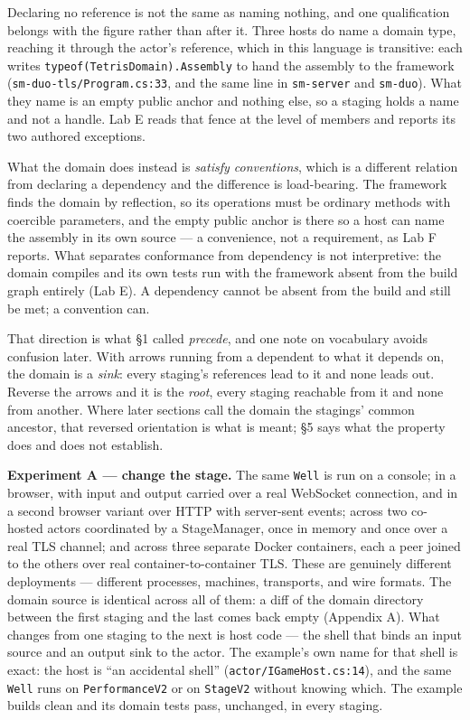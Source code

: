 \documentclass[
]{article}
\newcounter{none} %
\begin{document}
Declaring no reference is not the same as naming nothing, and one
qualification belongs with the figure rather than after it. Three hosts
do name a domain type, reaching it through the actor's reference, which
in this language is transitive: each writes
\texttt{typeof(TetrisDomain).Assembly} to hand the assembly to the
framework (\texttt{sm-duo-tls/Program.cs:33}, and the same line in
\texttt{sm-server} and \texttt{sm-duo}). What they name is an empty
public anchor and nothing else, so a staging holds a name and not a
handle. Lab E reads that fence at the level of members and reports its
two authored exceptions.

What the domain does instead is \emph{satisfy conventions}, which is a
different relation from declaring a dependency and the difference is
load-bearing. The framework finds the domain by reflection, so its
operations must be ordinary methods with coercible parameters, and the
empty public anchor is there so a host can name the assembly in its own
source --- a convenience, not a requirement, as Lab F reports. What
separates conformance from dependency is not interpretive: the domain
compiles and its own tests run with the framework absent from the build
graph entirely (Lab E). A dependency cannot be absent from the build and
still be met; a convention can.

That direction is what §1 called \emph{precede}, and one note on
vocabulary avoids confusion later. With arrows running from a dependent
to what it depends on, the domain is a \emph{sink}: every staging's
references lead to it and none leads out. Reverse the arrows and it is
the \emph{root}, every staging reachable from it and none from another.
Where later sections call the domain the stagings' common ancestor, that
reversed orientation is what is meant; §5 says what the property does
and does not establish.

\textbf{Experiment A --- change the stage.} The same \texttt{Well} is
run on a console; in a browser, with input and output carried over a
real WebSocket connection, and in a second browser variant over HTTP
with server-sent events; across two co-hosted actors coordinated by a
StageManager, once in memory and once over a real TLS channel; and
across three separate Docker containers, each a peer joined to the
others over real container-to-container TLS. These are genuinely
different deployments --- different processes, machines, transports, and
wire formats. The domain source is identical across all of them: a diff
of the domain directory between the first staging and the last comes
back empty (Appendix A). What changes from one staging to the next is
host code --- the shell that binds an input source and an output sink to
the actor. The example's own name for that shell is exact: the host is
``an accidental shell'' (\texttt{actor/IGameHost.cs:14}), and the same
\texttt{Well} runs on \texttt{PerformanceV2} or on \texttt{StageV2}
without knowing which. The example builds clean and its domain tests
pass, unchanged, in every staging.
\end{document}
